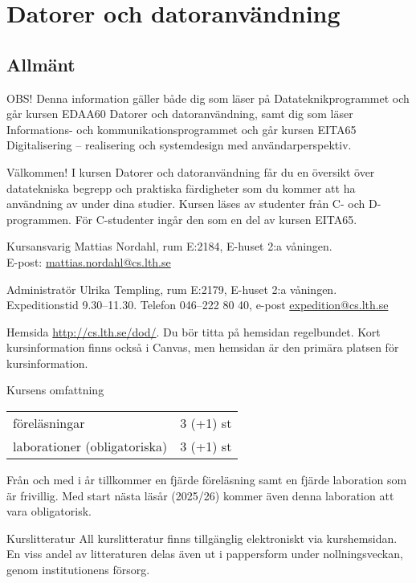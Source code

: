 \documentclass[a4paper]{memoir}
\begin{document}
\chapter*{Datorer och datoranvändning}

\section*{Allmänt}

\begin{Items}
    \item{}
    OBS! Denna information gäller både dig som läser på Datateknikprogrammet och går kursen EDAA60 Datorer och datoranvändning,
    samt dig som läser Informations- och kommunikationsprogrammet och går kursen EITA65 Digitalisering -- realisering och systemdesign med användarperspektiv.

    \item[Välkommen!]
    I kursen Datorer och datoranvändning får du en översikt över datatekniska begrepp och praktiska färdigheter som du kommer att ha användning av under dina studier. Kursen läses av studenter från C- och D-programmen. För C-studenter ingår den som en del av kursen EITA65.

    \item[Kursansvarig]
    Mattias Nordahl, rum E:2184, E-huset 2:a våningen.\\
    E-post: \url{mattias.nordahl@cs.lth.se}

    \item[Administratör]
    Ulrika Templing, rum E:2179, E-huset 2:a våningen. Expeditionstid 9.30--11.30. Telefon 046--222 80 40, e-post \url{expedition@cs.lth.se}

    \item[Hemsida]
    \url{http://cs.lth.se/dod/}. Du bör titta på hemsidan regelbundet. Kort kursinformation finns också i Canvas, men hemsidan är den primära platsen för kursinformation.

    \item[Kursens omfattning]
    \begin{tabular}[t]{@{}ll}
        föreläsningar                & 3 (+1) st \\
        laborationer (obligatoriska) & 3 (+1) st \\
    \end{tabular}

    Från och med i år tillkommer en fjärde föreläsning samt en fjärde laboration som är frivillig. Med start nästa läsår (2025/26) kommer även denna laboration att vara obligatorisk.

    \item[Kurslitteratur]
    All kurslitteratur finns tillgänglig elektroniskt via kurshemsidan. En viss andel av litteraturen delas även ut i pappersform under nollningsveckan, genom institutionens försorg.
\end{Items}
\end{document}
